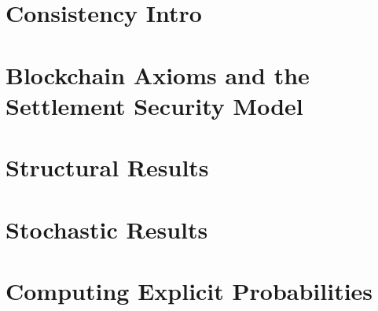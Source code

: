 \chapter{Consistency Intro}\label{ch:cons-intro}


\chapter{Blockchain Axioms and the Settlement Security Model}\label{ch:cons-model}



\chapter{Structural Results}





\chapter{Stochastic Results}



\chapter{Computing Explicit Probabilities}

